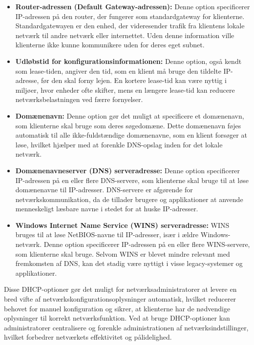 \begin{itemize}
	\item \textbf{Router-adressen (Default Gateway-adressen):}
	Denne option specificerer IP-adressen på den router, der fungerer som standardgateway for klienterne. Standardgatewayen er den enhed, der videresender trafik fra klientens lokale netværk til andre netværk eller internettet. Uden denne information ville klienterne ikke kunne kommunikere uden for deres eget subnet.
	
	\item \textbf{Udløbstid for konfigurationsinformationen:}
	Denne option, også kendt som lease-tiden, angiver den tid, som en klient må bruge den tildelte IP-adresse, før den skal forny lejen. En kortere lease-tid kan være nyttig i miljøer, hvor enheder ofte skifter, mens en længere lease-tid kan reducere netværksbelastningen ved færre fornyelser.
	
	\item \textbf{Domænenavn:}
	Denne option gør det muligt at specificere et domænenavn, som klienterne skal bruge som deres søgedomæne. Dette domænenavn føjes automatisk til alle ikke-fuldstændige domænenavne, som en klient forsøger at løse, hvilket hjælper med at forenkle DNS-opslag inden for det lokale netværk.
	
	\item \textbf{Domænenavneserver (DNS) serveradresse:}
	Denne option specificerer IP-adressen på en eller flere DNS-servere, som klienterne skal bruge til at løse domænenavne til IP-adresser. DNS-servere er afgørende for netværkskommunikation, da de tillader brugere og applikationer at anvende menneskeligt læsbare navne i stedet for at huske IP-adresser.
	
	\item \textbf{Windows Internet Name Service (WINS) serveradresse:}
	WINS bruges til at løse NetBIOS-navne til IP-adresser, især i ældre Windows-netværk. Denne option specificerer IP-adressen på en eller flere WINS-servere, som klienterne skal bruge. Selvom WINS er blevet mindre relevant med fremkomsten af DNS, kan det stadig være nyttigt i visse legacy-systemer og applikationer.
\end{itemize}
Disse DHCP-optioner gør det muligt for netværksadministratorer at levere en bred vifte af netværkskonfigurationsoplysninger automatisk, hvilket reducerer behovet for manuel konfiguration og sikrer, at klienterne har de nødvendige oplysninger til korrekt netværksfunktion. Ved at bruge DHCP-optioner kan administratorer centralisere og forenkle administrationen af netværksindstillinger, hvilket forbedrer netværkets effektivitet og pålidelighed.


